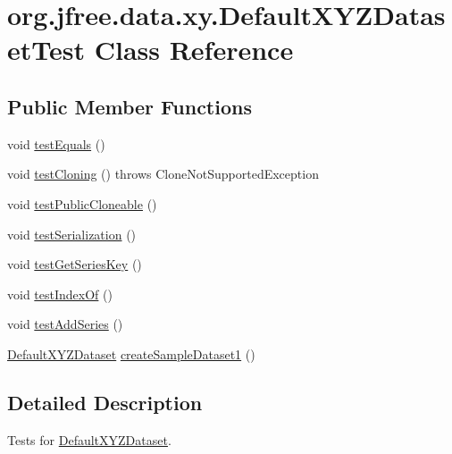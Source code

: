 \hypertarget{classorg_1_1jfree_1_1data_1_1xy_1_1_default_x_y_z_dataset_test}{}\section{org.\+jfree.\+data.\+xy.\+Default\+X\+Y\+Z\+Dataset\+Test Class Reference}
\label{classorg_1_1jfree_1_1data_1_1xy_1_1_default_x_y_z_dataset_test}
\subsection*{Public Member Functions}
\begin{DoxyCompactItemize}
\item 
void \mbox{\hyperlink{classorg_1_1jfree_1_1data_1_1xy_1_1_default_x_y_z_dataset_test_a9740c2e37d2a43eaf33ac66f959bbbee}{test\+Equals}} ()
\item 
void \mbox{\hyperlink{classorg_1_1jfree_1_1data_1_1xy_1_1_default_x_y_z_dataset_test_a47e9fa07abeb203de7b427bd60f91491}{test\+Cloning}} ()  throws Clone\+Not\+Supported\+Exception 
\item 
void \mbox{\hyperlink{classorg_1_1jfree_1_1data_1_1xy_1_1_default_x_y_z_dataset_test_a022fbd14e2190390586013d019f5532e}{test\+Public\+Cloneable}} ()
\item 
void \mbox{\hyperlink{classorg_1_1jfree_1_1data_1_1xy_1_1_default_x_y_z_dataset_test_a7ab6889be2dbc05fd53862ead7c65ace}{test\+Serialization}} ()
\item 
void \mbox{\hyperlink{classorg_1_1jfree_1_1data_1_1xy_1_1_default_x_y_z_dataset_test_a25bdbbeca38315ed9c1a0bcfdeb7138b}{test\+Get\+Series\+Key}} ()
\item 
void \mbox{\hyperlink{classorg_1_1jfree_1_1data_1_1xy_1_1_default_x_y_z_dataset_test_aef7f0cedecb9062513e3db46d865518a}{test\+Index\+Of}} ()
\item 
void \mbox{\hyperlink{classorg_1_1jfree_1_1data_1_1xy_1_1_default_x_y_z_dataset_test_ad6f966fd96406fba1cf238acce70dffe}{test\+Add\+Series}} ()
\item 
\mbox{\hyperlink{classorg_1_1jfree_1_1data_1_1xy_1_1_default_x_y_z_dataset}{Default\+X\+Y\+Z\+Dataset}} \mbox{\hyperlink{classorg_1_1jfree_1_1data_1_1xy_1_1_default_x_y_z_dataset_test_a4d867cf9963066fa00e1cbf0e4a54f6f}{create\+Sample\+Dataset1}} ()
\end{DoxyCompactItemize}


\subsection{Detailed Description}
Tests for \mbox{\hyperlink{classorg_1_1jfree_1_1data_1_1xy_1_1_default_x_y_z_dataset}{Default\+X\+Y\+Z\+Dataset}}. 

